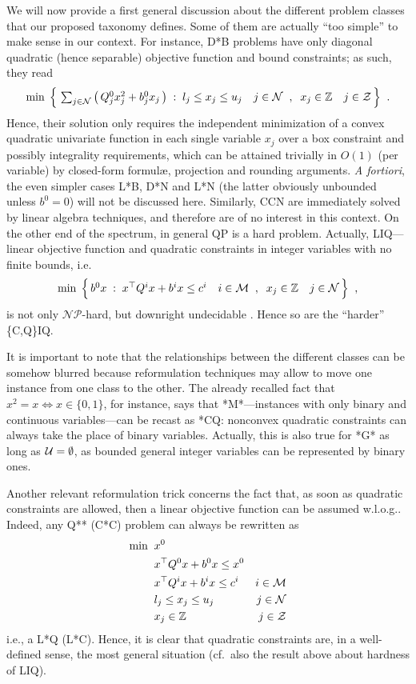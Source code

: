 We will now provide a first general discussion about the different problem classes that our proposed taxonomy defines. Some of them are actually ``too simple'' to make sense in our context. For instance, D*B problems have only diagonal quadratic (hence separable) objective function and bound constraints; as such, they read
\[
 \textstyle
 \min \; \Big\{ \,
 \sum_{j \in \mathcal{N}} \big( \, Q^0_j x_j^2 + b^0_j x_j \, \big) \;:\;
 l_j \leq x_j \leq u_j \quad j \in \mathcal{N} \;\;,\;\;
 x_j \in \mathbb{Z} \quad j \in \mathcal{Z} \, \Big\}
 \;\; .
\]
Hence, their solution only requires the independent minimization of a convex quadratic univariate function in each single variable $x_j$ over a box constraint and possibly integrality requirements, which can be attained trivially in $O(1)$ (per variable) by closed-form formul{\ae}, projection and rounding arguments. \emph{A fortiori}, the even simpler cases L*B, D*N and L*N (the latter obviously unbounded unless $b^0 = 0$) will not be discussed here. Similarly, CCN are immediately solved by linear algebra techniques, and therefore are of no interest in this context. On the other end of the spectrum, in general QP is a hard problem. Actually, LIQ---linear objective function and quadratic constraints in integer variables with no finite bounds, i.e. 
\[
 \textstyle
 \min \; \Big\{ \, b^0 x \;:\;
 x^\top Q^i x + b^i x \leq c^i \quad i \in \mathcal{M} \;\;,\;\;
 x_j \in \mathbb{Z} \quad j \in \mathcal{N} \, \Big\}
 \;\; ,
\]
is not only $\mathcal{NP}$-hard, but downright undecidable \cite{jeroslow}. Hence so are the ``harder'' \{C,Q\}IQ.

\smallskip
It is important to note that the relationships between the different classes can be somehow blurred because reformulation techniques may allow to move one instance from one class to the other. The already recalled fact that $x^2 = x \iff x \in \{0, 1\}$, for instance, says that *M*---instances with only binary and continuous variables---can be recast as *CQ: nonconvex quadratic constraints can always take the place of binary variables. Actually, this is also true for *G* as long as $\mathcal{U} = \emptyset$, as bounded general integer variables can be represented by binary ones.

Another relevant reformulation trick concerns the fact that, as soon as quadratic constraints are allowed, then a linear objective function can be assumed w.l.o.g.. Indeed, any Q** (C*C) problem can always be rewritten as
%
\begin{align*}	
 \min \;\;
 & x^0 \\
 & x^\top Q^0 x + b^0 x \leq x^0 & \\ 
 & x^\top Q^i x + b^i x \leq c^i & i \in \mathcal{M} \\ 
 & l_j \leq x_j \leq u_j & j \in \mathcal{N}  \\
 & x_j \in \mathbb{Z} & j \in \mathcal{Z}
\end{align*}
%
i.e., a L*Q (L*C). Hence, it is clear that quadratic constraints are, in a well-defined sense, the most general situation (cf.~also the result above about hardness of LIQ).

